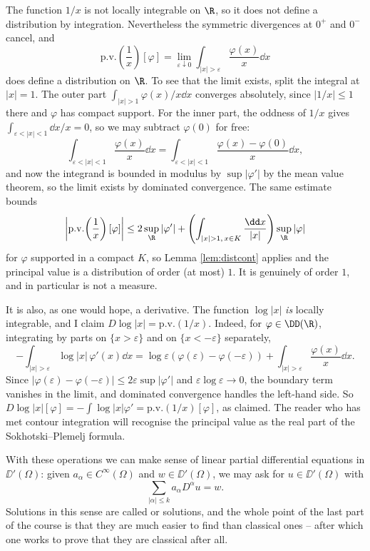 \begin{example}\label{ex:pv}
	The function $1/x$ is not locally integrable on $\R$, so it does not define a distribution by integration. Nevertheless the symmetric divergences at $0^+$ and $0^-$ cancel, and
	$$\mathrm{p.v.}\!\left(\frac 1x\right)[\varphi]=\lim_{\varepsilon\downarrow0}\int_{|x|>\varepsilon}\frac{\varphi(x)}{x}\dd x$$
	does define a distribution on $\R$. To see that the limit exists, split the integral at $|x|=1$. The outer part $\int_{|x|>1}\varphi(x)/x\dd x$ converges absolutely, since $|1/x|\le1$ there and $\varphi$ has compact support. For the inner part, the oddness of $1/x$ gives $\int_{\varepsilon<|x|<1}\dd x/x = 0$, so we may subtract $\varphi(0)$ for free:
	$$\int_{\varepsilon<|x|<1}\frac{\varphi(x)}{x}\dd x = \int_{\varepsilon<|x|<1}\frac{\varphi(x)-\varphi(0)}{x}\dd x,$$
	and now the integrand is bounded in modulus by $\sup|\varphi'|$ by the mean value theorem, so the limit exists by dominated convergence. The same estimate bounds
	$$\left| \mathrm{p.v.}\!\left(\frac 1x\right)[\varphi]\right|\le 2\sup_\R|\varphi'| + \left(\int_{|x|>1, \, x \in K}\frac{\dd x}{|x|}\right)\sup_\R|\varphi|$$
	for $\varphi$ supported in a compact $K$, so Lemma \ref{lem:distcont} applies and the principal value is a distribution of order (at most) $1$. It is genuinely of order $1$, and in particular is not a measure.

	It is also, as one would hope, a derivative. The function $\log|x|$ \emph{is} locally integrable, and I claim $D\log|x| = \mathrm{p.v.}(1/x)$. Indeed, for $\varphi \in \DD(\R)$, integrating by parts on $\{x>\varepsilon\}$ and on $\{x<-\varepsilon\}$ separately,
	$$-\int_{|x|>\varepsilon}\log|x|\,\varphi'(x)\dd x = \log\varepsilon\left(\varphi(\varepsilon)-\varphi(-\varepsilon)\right)+\int_{|x|>\varepsilon}\frac{\varphi(x)}{x}\dd x.$$
	Since $|\varphi(\varepsilon)-\varphi(-\varepsilon)|\le2\varepsilon\sup|\varphi'|$ and $\varepsilon\log\varepsilon\to0$, the boundary term vanishes in the limit, and dominated convergence handles the left-hand side. So $D\log|x|[\varphi]=-\int\log|x|\varphi' = \mathrm{p.v.}(1/x)[\varphi]$, as claimed. The reader who has met contour integration will recognise the principal value as the real part of the Sokhotski--Plemelj formula.
\end{example}

With these operations we can make sense of linear partial differential equations in $\DD'(\Omega)$: given $a_\alpha \in C^\infty(\Omega)$ and $w \in \DD'(\Omega)$, we may ask for $u \in \DD'(\Omega)$ with
$$\sum_{|\alpha|\le k}a_\alpha D^\alpha u = w.$$
Solutions in this sense are called  or  solutions, and the whole point of the last part of the course is that they are much easier to find than classical ones -- after which one works to prove that they are classical after all.

